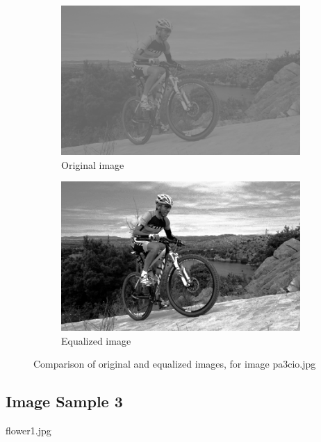\documentclass[10pt]{article}
\begin{document}
\begin{figure}[!ht]
  \centering
  \begin{subfigure}{0.4\textwidth}
    \includegraphics[width=\textwidth]{images/pat3cio-neq.jpg}
    \caption{Original image}
    \label{fig:pa3cio-original}
  \end{subfigure}
  \begin{subfigure}{0.4\textwidth}
    \includegraphics[width=\textwidth]{images/pa3cio-neq_out.jpg}
    \caption{Equalized image}
    \label{fig:pa3cio-equalized}
  \end{subfigure}
  \caption{Comparison of original and equalized images, for image pa3cio.jpg}
\end{figure}

\pagebreak

\subsection{Image Sample 3}
flower1.jpg\\
\end{document}
